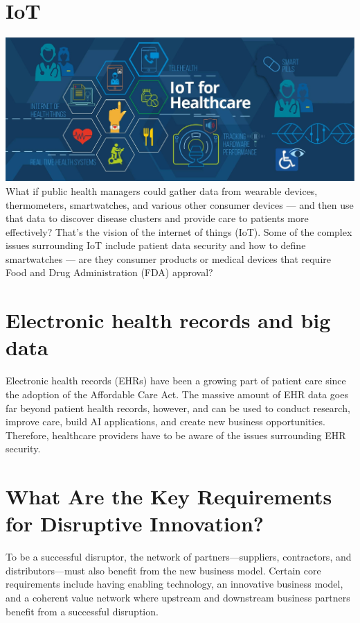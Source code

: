 \documentclass[12pt]{article}
\begin{document}
\section{IoT}
 \includegraphics[scale=0.17]{io.jpg }
 \\
What if public health managers could gather data from wearable devices, thermometers, smartwatches, and various other consumer devices — and then use that data to discover disease clusters and provide care to patients more effectively? That’s the vision of the internet of things (IoT). Some of the complex issues surrounding IoT include patient data security and how to define smartwatches — are they consumer products or medical devices that require Food and Drug Administration (FDA) approval?

\section{Electronic health records and big data}

Electronic health records (EHRs) have been a growing part of patient care since the adoption of the Affordable Care Act. The massive amount of EHR data goes far beyond patient health records, however, and can be used to conduct research, improve care, build AI applications, and create new business opportunities. Therefore, healthcare providers have to be aware of the issues surrounding EHR security.

\section{What Are the Key Requirements for Disruptive Innovation?}

To be a successful disruptor, the network of partners—suppliers, contractors, and distributors—must also benefit from the new business model. Certain core requirements include having enabling technology, an innovative business model, and a coherent value network where upstream and downstream business partners benefit from a successful disruption.


\enddocument
\end{document}
